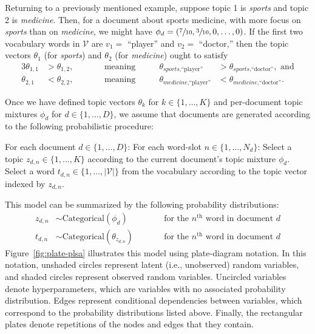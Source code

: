 \documentclass{article}
\newcommand{\nth}{^{\text{th}}}
\begin{document}
Returning to a previously mentioned example, suppose topic 1 is \emph{sports} and topic 2 is \emph{medicine}.
Then, for a document about sports medicine, with more focus on \emph{sports} than on \emph{medicine}, we might have $\phi_d = (\sfrac{7}{10}, \sfrac{3}{10}, 0, \ldots, 0)$.
If the first two vocabulary words in $\mathcal V$ are $v_1 =$ ``player'' and $v_2 =$ ``doctor,'' then the topic vectors $\theta_1$ (for \emph{sports}) and $\theta_2$ (for \emph{medicine}) ought to satisfy
\begin{alignat}{3}
\theta_{1,1} &> \theta_{1,2}, &&\qquad \text{meaning}\qquad& \theta_{\textit{sports}, \text{``player''}} &> \theta_{\textit{sports}, \text{``doctor''}}, \text{ and} \\
\theta_{2,1} &< \theta_{2,2}, &&\qquad \text{meaning}\qquad& \theta_{\textit{medicine}, \text{``player''}} &< \theta_{\textit{medicine}, \text{``doctor''}}.
\end{alignat}

Once we have defined topic vectors $\theta_k$ for $k \in \{1, \ldots, K\}$ and per-document topic mixtures $\phi_d$ for $d \in \{1, \ldots, D\}$, we assume that documents are generated according to the following probabilistic procedure:
\begin{outline}
\1 For each document $d \in \{1, \ldots, D\}$:
  \2 For each word-slot $n \in \{1, \ldots, N_d\}$:
    \3 Select a topic $z_{d,n} \in \{1, \ldots, K\}$ according to the current document's topic mixture $\phi_d$.
    \3 Select a word $t_{d,n} \in \{1, \ldots, |\mathcal V|\}$ from the vocabulary according to the topic vector indexed by $z_{d,n}$.
\end{outline}

This model can be summarized by the following probability distributions:
\begin{align}
z_{d,n} &\sim \text{Categorical}(\phi_d) &\qquad&\text{for the $n\nth$ word in document $d$} \\
t_{d,n} &\sim \text{Categorical}(\theta_{z_{d,n}}) &\qquad&\text{for the $n\nth$ word in document $d$}
\end{align}
Figure~\ref{fig:plate-plsa} illustrates this model using plate-diagram notation.
In this notation, unshaded circles represent latent (i.e., unobserved) random variables, and shaded circles represent observed random variables.
Uncircled variables denote hyperparameters, which are variables with no associated probability distribution.
Edges represent conditional dependencies between variables, which correspond to the probability distributions listed above.
Finally, the rectangular plates denote repetitions of the nodes and edges that they contain.
\end{document}

